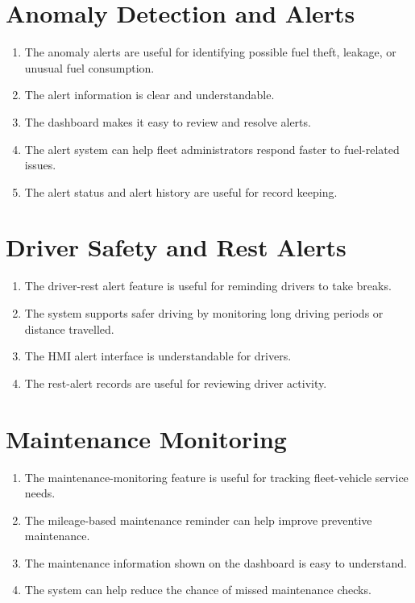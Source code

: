 \section{Anomaly Detection and Alerts}

\begin{enumerate}
    \item The anomaly alerts are useful for identifying possible fuel theft, leakage, or unusual fuel consumption.
    \item The alert information is clear and understandable.
    \item The dashboard makes it easy to review and resolve alerts.
    \item The alert system can help fleet administrators respond faster to fuel-related issues.
    \item The alert status and alert history are useful for record keeping.
\end{enumerate}

\section{Driver Safety and Rest Alerts}

\begin{enumerate}
    \item The driver-rest alert feature is useful for reminding drivers to take breaks.
    \item The system supports safer driving by monitoring long driving periods or distance travelled.
    \item The HMI alert interface is understandable for drivers.
    \item The rest-alert records are useful for reviewing driver activity.
\end{enumerate}

\section{Maintenance Monitoring}

\begin{enumerate}
    \item The maintenance-monitoring feature is useful for tracking fleet-vehicle service needs.
    \item The mileage-based maintenance reminder can help improve preventive maintenance.
    \item The maintenance information shown on the dashboard is easy to understand.
    \item The system can help reduce the chance of missed maintenance checks.
\end{enumerate}

